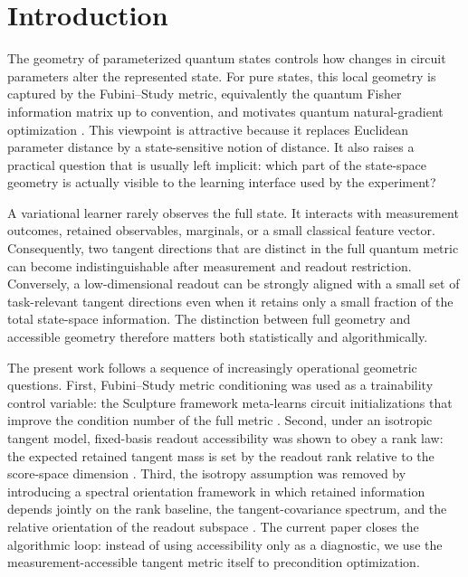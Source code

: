 \section{Introduction}

The geometry of parameterized quantum states controls how changes in circuit parameters alter the represented state. For pure states, this local geometry is captured by the Fubini--Study metric, equivalently the quantum Fisher information matrix up to convention, and motivates quantum natural-gradient optimization \cite{Braunstein1994,Stokes2020}. This viewpoint is attractive because it replaces Euclidean parameter distance by a state-sensitive notion of distance. It also raises a practical question that is usually left implicit: which part of the state-space geometry is actually visible to the learning interface used by the experiment?

A variational learner rarely observes the full state. It interacts with measurement outcomes, retained observables, marginals, or a small classical feature vector. Consequently, two tangent directions that are distinct in the full quantum metric can become indistinguishable after measurement and readout restriction. Conversely, a low-dimensional readout can be strongly aligned with a small set of task-relevant tangent directions even when it retains only a small fraction of the total state-space information. The distinction between full geometry and accessible geometry therefore matters both statistically and algorithmically.

The present work follows a sequence of increasingly operational geometric questions. First, Fubini--Study metric conditioning was used as a trainability control variable: the Sculpture framework meta-learns circuit initializations that improve the condition number of the full metric \cite{AitHaddouBennai2025Sculpting}. Second, under an isotropic tangent model, fixed-basis readout accessibility was shown to obey a rank law: the expected retained tangent mass is set by the readout rank relative to the score-space dimension \cite{AitHaddou2026ReadoutRank}. Third, the isotropy assumption was removed by introducing a spectral orientation framework in which retained information depends jointly on the rank baseline, the tangent-covariance spectrum, and the relative orientation of the readout subspace \cite{AitHaddou2026SpectralGeometry}. The current paper closes the algorithmic loop: instead of using accessibility only as a diagnostic, we use the measurement-accessible tangent metric itself to precondition optimization.

